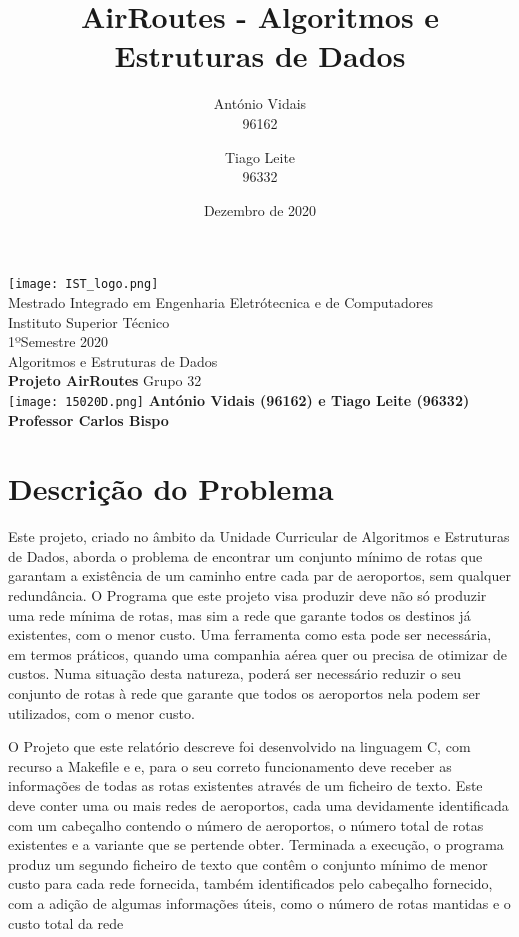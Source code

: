 \documentclass[14pt]{article}
\title{AirRoutes - Algoritmos e Estruturas de Dados}
\date{Dezembro de 2020}
\author{António Vidais \\96162 \and Tiago Leite \\96332}
\begin{document}
    \begin{titlepage}
        \begin{center}

            \texttt{[image: IST\_logo.png]}\\
            \vspace{0.5cm}
            Mestrado Integrado em Engenharia Eletrótecnica e de Computadores\\
            Instituto Superior Técnico\\
            1ºSemestre 2020\\
            Algoritmos e Estruturas de Dados\\
            \vspace*{1.5cm}
            \Huge
            \textbf{Projeto AirRoutes}
            \vspace{0.5cm}
            Grupo 32\\

                \vfill
                \texttt{[image: 15020D.png]}
                \vfill
            \Large
            \textbf{António Vidais (96162) e Tiago Leite (96332)}\\
            \textbf{Professor Carlos Bispo}
        \end{center}
    \end{titlepage}

        \tableofcontents

    \section{Descrição do Problema} \label{sec:d.problema}\index
    Este projeto, criado no âmbito da Unidade Curricular de Algoritmos e Estruturas de Dados, aborda o problema de
    encontrar um conjunto mínimo de rotas que garantam a existência de um caminho entre cada par de aeroportos,
    sem qualquer redundância.
    O Programa que este projeto visa produzir deve não só produzir uma rede mínima de rotas, mas sim a rede que garante
    todos os destinos já existentes, com o menor custo.
    Uma ferramenta como esta pode ser necessária, em termos práticos, quando uma companhia aérea quer ou precisa de otimizar de custos.
    Numa situação desta natureza, poderá ser necessário reduzir o seu conjunto de rotas à rede que
    garante que todos os aeroportos nela podem ser utilizados, com o menor custo.

    O Projeto que este relatório descreve foi desenvolvido na linguagem C, com recurso a Makefile e  e, para o seu correto funcionamento deve
    receber as informações de todas as rotas existentes através de um ficheiro de texto.
    Este deve conter uma ou mais redes de aeroportos, cada uma devidamente identificada com um cabeçalho contendo o
    número de aeroportos, o número total de rotas existentes e a variante que se pertende obter.
    Terminada a execução, o programa produz um segundo ficheiro de texto que contêm o conjunto mínimo de menor custo
    para cada rede fornecida, também identificados pelo cabeçalho fornecido, com a adição de algumas informações úteis,
    como o número de rotas mantidas e o custo total da rede
\end{document}
